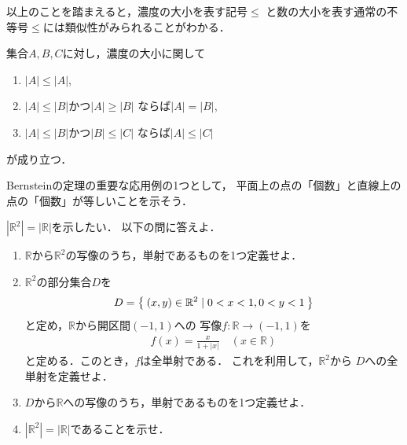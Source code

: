    以上のことを踏まえると，濃度の大小を表す記号$\leq$
   と数の大小を表す通常の不等号$\leq$には類似性がみられることがわかる．

   \begin{thm} \label{thm:noudojunjo}
     集合$A,B,C$に対し，濃度の大小に関して
     \begin{enumerate}
       \item $\lvert A \rvert \leq \lvert A \rvert$,
       \item $\lvert A \rvert \leq \lvert B \rvert$かつ$\lvert A \rvert \geq \lvert B \rvert$
         ならば$\lvert A \rvert = \lvert B \rvert$,
       \item $\lvert A \rvert \leq \lvert B \rvert$かつ$\lvert B \rvert \leq \lvert C \rvert$
         ならば$\lvert A \rvert \leq \lvert C \rvert $
     \end{enumerate}
     が成り立つ．
   \end{thm}

   Bernsteinの定理の重要な応用例の1つとして，
   平面上の点の「個数」と直線上の点の「個数」が等しいことを示そう．

   \begin{que} \label{que:R2Rnoudo}
     $\left \lvert \mathbb{R}^2 \right \rvert = \lvert \mathbb{R} \rvert$を示したい．
     以下の問に答えよ．
     \begin{enumerate}
       \item $\mathbb{R} $から$\mathbb{R}^2$の写像のうち，単射であるものを1つ定義せよ．
       \item $\mathbb{R}^2$の部分集合$D$を
         \begin{align*}
           D = \Set{ (x,y) \in \mathbb{R}^2 \mid 0<x<1 ,  0<y<1 }
         \end{align*}
         と定め，$\mathbb{R}$から開区間$(-1,1)$への
         写像$f: \mathbb{R} \longrightarrow (-1,1)$を
         \begin{align*}
           f(x) = \frac{x}{1+ \lvert x \rvert } \quad ( x \in \mathbb{R} )
         \end{align*}
         と定める．このとき，$f$は全単射である．
         これを利用して，$\mathbb{R}^2$から
         $D$への全単射を定義せよ．
       \item $D$から$\mathbb{R}$への写像のうち，単射であるものを1つ定義せよ．
       \item $\left \lvert \mathbb{R}^2  \right \rvert 
         = \lvert \mathbb{R} \rvert$であることを示せ．
        \end{enumerate}
   \end{que}

